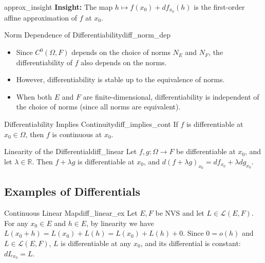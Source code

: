 \documentclass[11pt, a4paper]{article}
\newcommand{\R}{\mathbb{R}}
\begin{document}
\begin{remark}{}{approx_insight}
\textbf{Insight:} The map $h \mapsto f(x_0) + df_{x_0}(h)$ is the first-order affine approximation of $f$ at $x_0$.
\end{remark}

\begin{remark}{Norm Dependence of Differentiability}{diff_norm_dep}
\begin{itemize}
    \item Since $C^0(\Omega, F)$ depends on the choice of norms $N_E$ and $N_F$, the differentiability of $f$ also depends on the norms.
    \item However, differentiability is stable up to the equivalence of norms.
    \item When both $E$ and $F$ are finite-dimensional, differentiability is independent of the choice of norms (since all norms are equivalent).
\end{itemize}
\end{remark}

\begin{proposition}{Differentiability Implies Continuity}{diff_implies_cont}
If $f$ is differentiable at $x_0 \in \Omega$, then $f$ is continuous at $x_0$.
\end{proposition}

\begin{proposition}{Linearity of the Differential}{diff_linear}
Let $f, g: \Omega \to F$ be differentiable at $x_0$, and let $\lambda \in \R$. Then $f + \lambda g$ is differentiable at $x_0$, and $d(f + \lambda g)_{x_0} = df_{x_0} + \lambda dg_{x_0}$.
\end{proposition}

\subsection{Examples of Differentials}
\begin{example}{Continuous Linear Map}{diff_linear_ex}
Let $E, F$ be NVS and let $L \in \mathcal{L}(E, F)$.
For any $x_0 \in E$ and $h \in E$, by linearity we have $L(x_0 + h) = L(x_0) + L(h) = L(x_0) + L(h) + 0$.
Since $0 = o(h)$ and $L \in \mathcal{L}(E, F)$, $L$ is differentiable at any $x_0$, and its differential is constant: $dL_{x_0} = L$.
\end{example}
\end{document}

